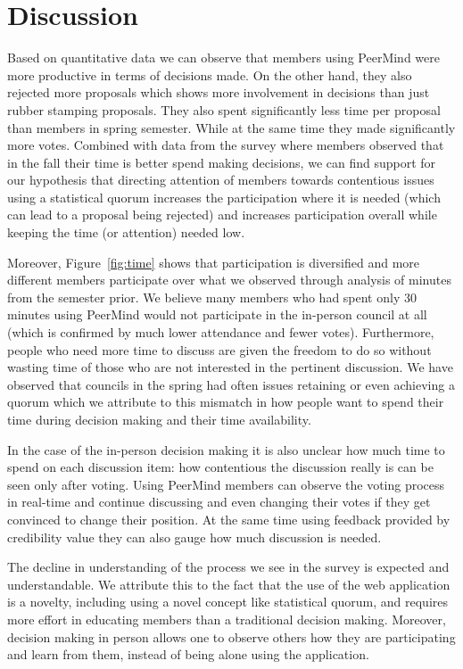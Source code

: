 \documentclass[format=acmsmall, review=true, screen=true, anonymous=true]{acmart}
\begin{document}
\section{Discussion}
\label{sec:discussion}

Based on quantitative data we can observe that members using PeerMind were more productive in
terms of decisions made.
On the other hand, they also rejected more proposals which shows more involvement in decisions
than just rubber stamping proposals.
They also spent significantly less time per proposal than members in spring semester.
While at the same time they made significantly more votes.
Combined with data from the survey where members observed that in the fall their time
is better spend making decisions, we can find support for our hypothesis that directing
attention of members towards contentious issues using a statistical quorum increases the
participation where it is needed (which can lead to a proposal being rejected) and
increases participation overall while keeping the time (or attention) needed low.

Moreover, Figure~\ref{fig:time} shows that participation is diversified and more different
members participate over what we observed through analysis of minutes from the semester prior.
We believe many members who had spent only 30 minutes using PeerMind would not participate
in the in-person council at all (which is confirmed by much lower attendance and fewer votes).
Furthermore, people who need more time to discuss are given the freedom to do so without wasting
time of those who are not interested in the pertinent discussion.
We have observed that councils in the spring had often issues retaining or even achieving a
quorum which we attribute to this mismatch in how people want to spend their time during
decision making and their time availability.

In the case of the in-person decision making it is also unclear how much time to spend on each
discussion item: how contentious the discussion really is can be seen only after voting.
Using PeerMind members can observe the voting process in real-time and continue discussing
and even changing their votes if they get convinced to change their position.
At the same time using feedback provided by credibility value they can also gauge how
much discussion is needed.


The decline in understanding of the process we see in the survey is expected and understandable.
We attribute this to the fact that the use of the web application is
a novelty, including using a novel concept like statistical quorum, and requires more effort
in educating members than a traditional decision making.
Moreover, decision making in person allows one to observe others how they are participating and
learn from them, instead of being alone using the application.
\end{document}
